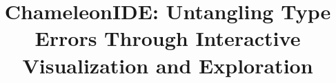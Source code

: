 \documentclass[conference]{IEEEtran}
\newcommand{\chameleon}{ChameleonIDE}
\newcommand{\ignore}[1]{}
\begin{document}
\title{\chameleon{}: Untangling Type Errors Through Interactive
  Visualization and Exploration
}

\ignore{
\author{\IEEEauthorblockN{1\textsuperscript{st} Given Name Surname}
\IEEEauthorblockA{\textit{dept. name of organization (of Aff.)} \\
\textit{name of organization (of Aff.)}\\
City, Country \\
email address or ORCID}
\and
\IEEEauthorblockN{2\textsuperscript{nd} Given Name Surname}
\IEEEauthorblockA{\textit{dept. name of organization (of Aff.)} \\
\textit{name of organization (of Aff.)}\\
City, Country \\
email address or ORCID}
\and
\IEEEauthorblockN{3\textsuperscript{rd} Given Name Surname}
\IEEEauthorblockA{\textit{dept. name of organization (of Aff.)} \\
\textit{name of organization (of Aff.)}\\
City, Country \\
email address or ORCID}
\and
\IEEEauthorblockN{4\textsuperscript{th} Given Name Surname}
\IEEEauthorblockA{\textit{dept. name of organization (of Aff.)} \\
\textit{name of organization (of Aff.)}\\
City, Country \\
email address or ORCID}
\and
\IEEEauthorblockN{5\textsuperscript{th} Given Name Surname}
\IEEEauthorblockA{\textit{dept. name of organization (of Aff.)} \\
\textit{name of organization (of Aff.)}\\
City, Country \\
email address or ORCID}
\and
\IEEEauthorblockN{6\textsuperscript{th} Given Name Surname}
\IEEEauthorblockA{\textit{dept. name of organization (of Aff.)} \\
\textit{name of organization (of Aff.)}\\
City, Country \\
email address or ORCID}
}
}

\maketitle
\end{document}
